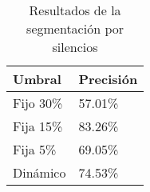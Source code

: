 \begin{table}[H]
\centering
\caption{Resultados de la segmentación por silencios}
\label{tab:resultados_segmentacion_silencios}
\begin{tabular}{|l|l|}
\hline
\textbf{Umbral} & \textbf{Precisión}  \\ \hline
Fijo 30\%       & 57.01\%             \\  \hline
Fija 15\%       & 83.26\%             \\  \hline
Fija 5\%        & 69.05\%             \\  \hline
Dinámico        & 74.53\%             \\  \hline
\end{tabular}
\end{table}